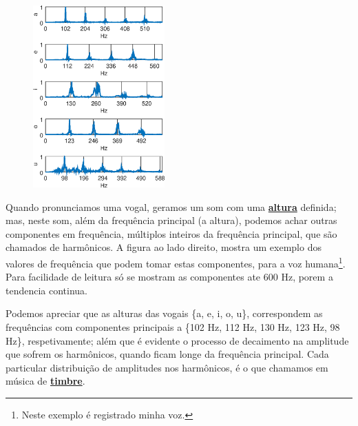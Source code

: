 \begin{elaboracion}[title=Timbre das vogais]

\begin{figure}
\begin{center}
\includegraphics[width=0.45\textwidth]{chapters/cap-musica-basica/vocales-fourier.eps}
\end{center}
\end{figure}
Quando pronunciamos uma  vogal, geramos um som com uma \hyperref[sec:pos:Altura]{\textbf{altura}} definida;
mas, neste som, além da  frequência principal (a altura), podemos achar outras componentes em frequência,
múltiplos inteiros da  frequência principal, que são chamados de harmônicos.
A figura ao lado direito, mostra um exemplo dos valores de frequência 
que podem tomar estas componentes, para a voz humana\footnote{Neste exemplo é registrado minha voz.}.
Para facilidade de leitura só se mostram as componentes ate 600 Hz, 
porem a tendencia continua. 

Podemos apreciar que as alturas  das vogais \{a, e, i, o, u\}, 
correspondem as frequências com componentes principais a \{102 Hz, 112 Hz, 130 Hz, 123 Hz, 98 Hz\}, respetivamente;
além que é evidente o processo de decaimento na amplitude que sofrem os harmônicos,
quando ficam longe da frequência principal.
Cada particular distribuição de amplitudes nos harmônicos, 
é o que chamamos em música de \hyperref[sec:pos:timbre]{\textbf{timbre}}.


\end{elaboracion}
